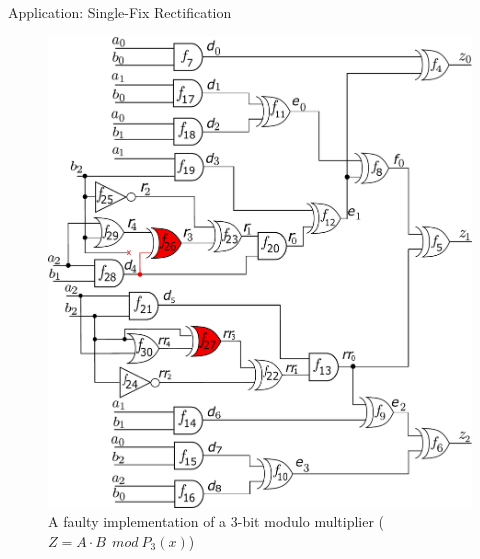 \begin{frame}{\large Application: Single-Fix Rectification}
		\begin{figure}[hbt]
		\centering
		\includegraphics[scale=0.26]{mas_3_ddc_mfr_a.pdf}
		\caption*{A faulty implementation of a 3-bit modulo multiplier ($Z = A \cdot B~~mod~P_3(x)$)
		}\label{fig:mas_bug_ca}
		\end{figure}


\end{frame}
